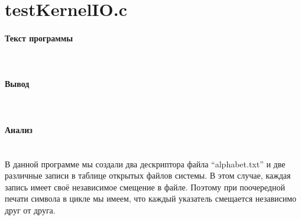 \section{testKernelIO.c}

\paragraph{Текст программы}\hfill\\


\paragraph{Вывод}\hfill\\


\paragraph{Анализ}\hfill\\

В данной программе мы создали два дескриптора файла “alphabet.txt” и две различные записи в таблице открытых файлов системы. В этом случае, каждая запись имеет своё независимое смещение в файле. Поэтому при поочередной печати символа в цикле мы имеем, что каждый указатель смещается независимо друг от друга.